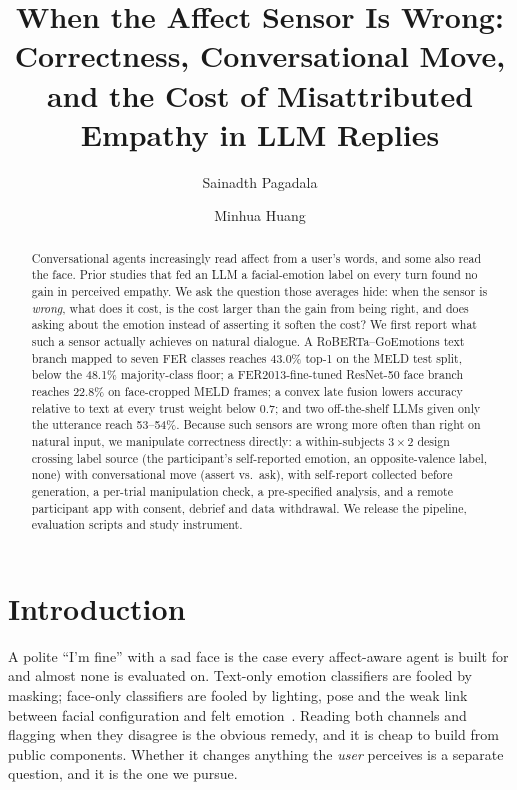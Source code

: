 \documentclass[sigconf,nonacm]{acmart}
\title[When the Affect Sensor Is Wrong]{When the Affect Sensor Is Wrong: Correctness, Conversational Move, and the Cost of Misattributed Empathy in LLM Replies}
\author{Sainadth Pagadala}
\affiliation{\institution{Texas A\&M University--Corpus Christi}\city{Corpus Christi}\state{TX}\country{USA}}
\author{Minhua Huang}
\affiliation{\institution{Texas A\&M University--Corpus Christi}\city{Corpus Christi}\state{TX}\country{USA}}
\begin{document}
\begin{abstract}
Conversational agents increasingly read affect from a user's words, and some also read the face. Prior studies that fed an LLM a facial-emotion label on every turn found no gain in perceived empathy. We ask the question those averages hide: when the sensor is \emph{wrong}, what does it cost, is the cost larger than the gain from being right, and does asking about the emotion instead of asserting it soften the cost? We first report what such a sensor actually achieves on natural dialogue. A RoBERTa--GoEmotions text branch mapped to seven FER classes reaches 43.0\% top-1 on the MELD test split, below the 48.1\% majority-class floor; a FER2013-fine-tuned ResNet-50 face branch reaches 22.8\% on face-cropped MELD frames; a convex late fusion lowers accuracy relative to text at every trust weight below 0.7; and two off-the-shelf LLMs given only the utterance reach 53--54\%. Because such sensors are wrong more often than right on natural input, we manipulate correctness directly: a within-subjects $3\times2$ design crossing label source (the participant's self-reported emotion, an opposite-valence label, none) with conversational move (assert vs.\ ask), with self-report collected before generation, a per-trial manipulation check, a pre-specified analysis, and a remote participant app with consent, debrief and data withdrawal. We release the pipeline, evaluation scripts and study instrument.
\end{abstract}
\maketitle

\section{Introduction}
A polite ``I'm fine'' with a sad face is the case every affect-aware agent is built for and almost none is evaluated on. Text-only emotion classifiers are fooled by masking; face-only classifiers are fooled by lighting, pose and the weak link between facial configuration and felt emotion~\cite{barrett2019emotional}. Reading both channels and flagging when they disagree is the obvious remedy, and it is cheap to build from public components. Whether it changes anything the \emph{user} perceives is a separate question, and it is the one we pursue.
\end{document}
